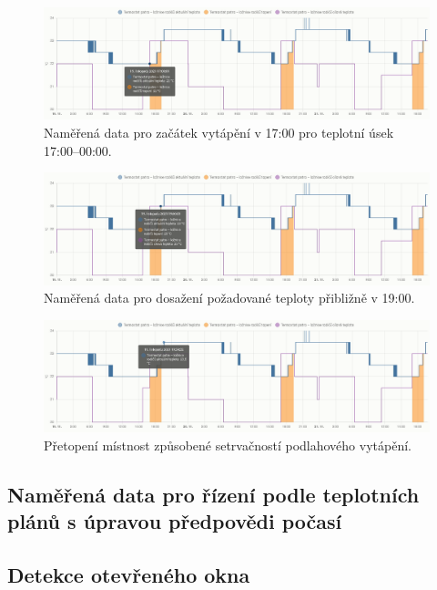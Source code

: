 \begin{figure}[H]
    \centering
    \includegraphics[width=\textwidth]{images/testovani/teplotni-plany/loznice-rodicu-termostat-zacatek-vytapeni.png}
    \caption{Naměřená data pro začátek vytápění v 17:00 pro teplotní úsek 17:00–00:00.}
    \label{fig:loznice-rodicu-termostat-zacatek-vytapeni}
\end{figure}

\begin{figure}[H]
    \centering
    \includegraphics[width=\textwidth]{images/testovani/teplotni-plany/loznice-rodicu-termostat-konec-vytepeni.png}
    \caption{Naměřená data pro dosažení požadované teploty přibližně v 19:00.}
    \label{fig:loznice-rodicu-termostat-konec-vytepeni}
\end{figure}

\begin{figure}[H]
    \centering
    \includegraphics[width=\textwidth]{images/testovani/teplotni-plany/loznice-rodicu-termostat-presazeni-teploty.png}
    \caption{Přetopení místnost způsobené setrvačností podlahového vytápění.}
    \label{fig:loznice-rodicu-termostat-presazeni-teploty}
\end{figure}

\subsection{Naměřená data pro řízení podle teplotních plánů s úpravou předpovědi počasí}

\subsection{Detekce otevřeného okna}